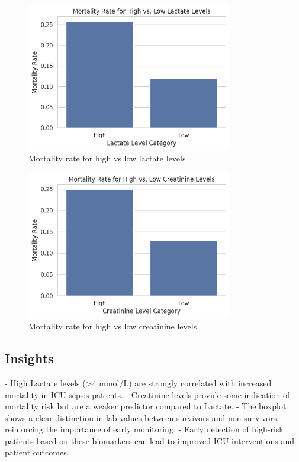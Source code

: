 \documentclass[a4paper,10pt]{article}
\begin{document}
\begin{figure}[h]
    \centering
    \includegraphics[width=0.8\textwidth]{figure4c.png}
    \caption{Mortality rate for high vs low lactate levels.}
    \label{fig:lactate_mortality}
\end{figure}

\begin{figure}[h]
    \centering
    \includegraphics[width=0.8\textwidth]{figure4d.png}
    \caption{Mortality rate for high vs low creatinine levels.}
    \label{fig:creatinine_mortality}
\end{figure}

\subsection{Insights}
- High Lactate levels (\textgreater 4 mmol/L) are strongly correlated with increased mortality in ICU sepsis patients.
- Creatinine levels provide some indication of mortality risk but are a weaker predictor compared to Lactate.
- The boxplot shows a clear distinction in lab values between survivors and non-survivors, reinforcing the importance of early monitoring.
- Early detection of high-risk patients based on these biomarkers can lead to improved ICU interventions and patient outcomes.
\end{document}
